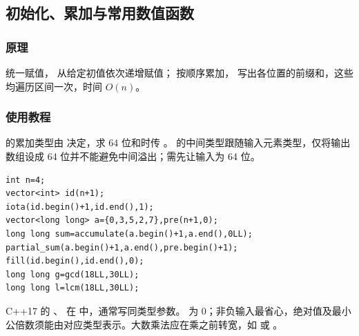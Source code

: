 \subsection{初始化、累加与常用数值函数}
\label{stl:numeric}
\subsubsection*{原理}
 统一赋值， 从给定初值依次递增赋值； 按顺序累加， 写出各位置的前缀和，这些均遍历区间一次，时间 $O(n)$。
\subsubsection*{使用教程}
 的累加类型由  决定，求 64 位和时传 。 的中间类型跟随输入元素类型，仅将输出数组设成 64 位并不能避免中间溢出；需先让输入为 64 位。
\begin{lstlisting}[style=mtycpp,numbers=none]
int n=4;
vector<int> id(n+1);
iota(id.begin()+1,id.end(),1);
vector<long long> a={0,3,5,2,7},pre(n+1,0);
long long sum=accumulate(a.begin()+1,a.end(),0LL);
partial_sum(a.begin()+1,a.end(),pre.begin()+1);
fill(id.begin(),id.end(),0);
long long g=gcd(18LL,30LL);
long long l=lcm(18LL,30LL);
\end{lstlisting}
C++17 的 、 在  中，通常写同类型参数。 为 0；非负输入最省心，绝对值及最小公倍数须能由对应类型表示。大数乘法应在乘之前转宽，如  或 。

